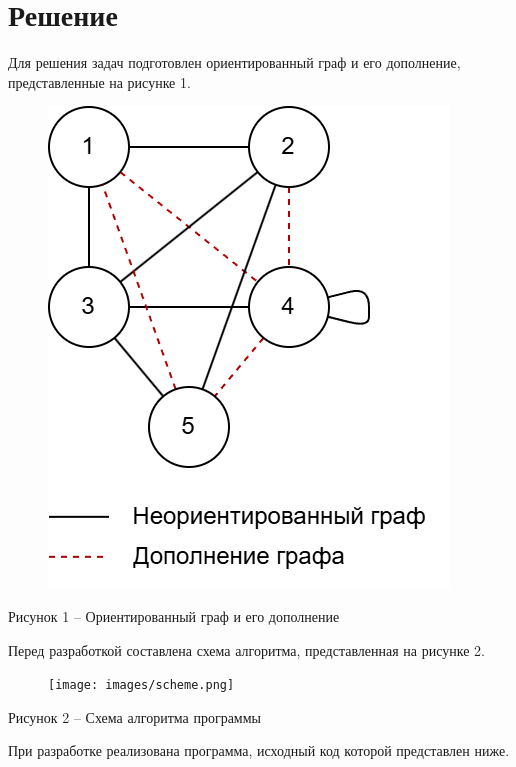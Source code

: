 \documentclass[a4paper,14pt]{extarticle}
\begin{document}
  \section*{\hspace{12.5mm}Решение}

  Для решения задач подготовлен ориентированный граф и его дополнение, представленные на рисунке 1.

  \begin{figure}[h]
    \centering
    \includegraphics[width=0.4\linewidth]{images/graph.png}
  \end{figure}
  \begin{center}
    Рисунок 1 – Ориентированный граф и его дополнение
  \end{center}

  \pagebreak
  Перед разработкой составлена схема алгоритма, представленная на рисунке 2.

  \begin{figure}[h]
    \centering
    \texttt{[image: images/sсheme.png]}
  \end{figure}
  \begin{center}
    Рисунок 2 – Схема алгоритма программы
  \end{center}

  \pagebreak
  При разработке реализована программа, исходный код которой представлен ниже.

  \begingroup
    \linespread{1}
\end{document}
